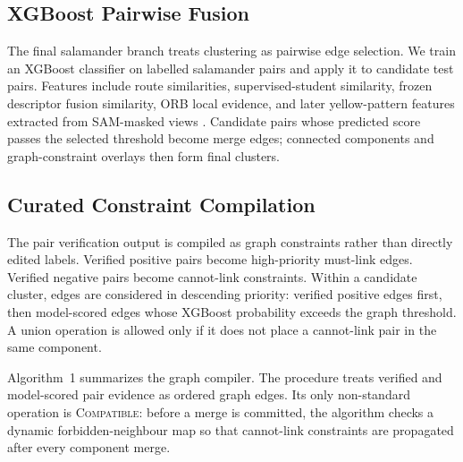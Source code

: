 \documentclass{ceurart}
\begin{document}
\subsection{XGBoost Pairwise Fusion}
The final salamander branch treats clustering as pairwise edge selection. We train an XGBoost classifier \cite{xgboost} on labelled salamander pairs and apply it to candidate test pairs. Features include route similarities, supervised-student similarity, frozen descriptor fusion similarity, ORB local evidence, and later yellow-pattern features extracted from SAM-masked views \cite{sam}. Candidate pairs whose predicted score passes the selected threshold become merge edges; connected components and graph-constraint overlays then form final clusters.

\subsection{Curated Constraint Compilation}
The pair verification output is compiled as graph constraints rather than directly edited labels. Verified positive pairs become high-priority must-link edges. Verified negative pairs become cannot-link constraints. Within a candidate cluster, edges are considered in descending priority: verified positive edges first, then model-scored edges whose XGBoost probability exceeds the graph threshold. A union operation is allowed only if it does not place a cannot-link pair in the same component.

Algorithm~1 summarizes the graph compiler. The procedure treats verified and model-scored pair evidence as ordered graph edges. Its only non-standard operation is \textsc{Compatible}: before a merge is committed, the algorithm checks a dynamic forbidden-neighbour map so that cannot-link constraints are propagated after every component merge.
\end{document}
